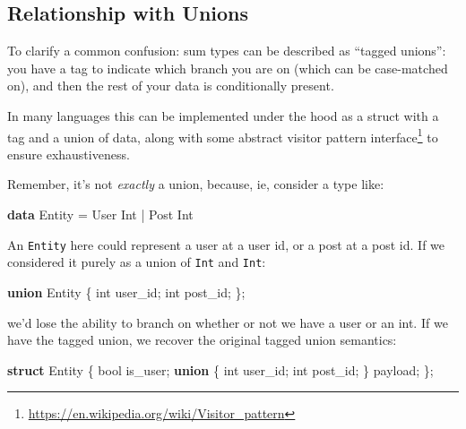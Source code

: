 \documentclass[]{article}
\newenvironment{Shaded}{}{}
\newcommand{\DataTypeTok}[1]{\textcolor[rgb]{0.56,0.13,0.00}{#1}}
\newcommand{\KeywordTok}[1]{\textcolor[rgb]{0.00,0.44,0.13}{\textbf{#1}}}
\newcommand{\NormalTok}[1]{#1}
\newcommand{\OperatorTok}[1]{\textcolor[rgb]{0.40,0.40,0.40}{#1}}
\newcommand{\OtherTok}[1]{\textcolor[rgb]{0.00,0.44,0.13}{#1}}
\renewcommand{\href}[2]{#2\footnote{\url{#1}}}
\begin{document}
\subsection{Relationship with Unions}\label{relationship-with-unions}

To clarify a common confusion: sum types can be described as ``tagged unions'':
you have a tag to indicate which branch you are on (which can be case-matched
on), and then the rest of your data is conditionally present.

In many languages this can be implemented under the hood as a struct with a tag
and a union of data, along with some
\href{https://en.wikipedia.org/wiki/Visitor_pattern}{abstract visitor pattern
interface} to ensure exhaustiveness.

Remember, it's not \emph{exactly} a union, because, ie, consider a type like:

\begin{Shaded}
\begin{Highlighting}[]
\KeywordTok{data} \DataTypeTok{Entity} \OtherTok{=} \DataTypeTok{User} \DataTypeTok{Int} \OperatorTok{|} \DataTypeTok{Post} \DataTypeTok{Int}
\end{Highlighting}
\end{Shaded}

An \texttt{Entity} here could represent a user at a user id, or a post at a post
id. If we considered it purely as a union of \texttt{Int} and \texttt{Int}:

\begin{Shaded}
\begin{Highlighting}[]
\KeywordTok{union}\NormalTok{ Entity }\OperatorTok{\{}
    \DataTypeTok{int}\NormalTok{ user\_id}\OperatorTok{;}
    \DataTypeTok{int}\NormalTok{ post\_id}\OperatorTok{;}
\OperatorTok{\};}
\end{Highlighting}
\end{Shaded}

we'd lose the ability to branch on whether or not we have a user or an int. If
we have the tagged union, we recover the original tagged union semantics:

\begin{Shaded}
\begin{Highlighting}[]
\KeywordTok{struct}\NormalTok{ Entity }\OperatorTok{\{}
    \DataTypeTok{bool}\NormalTok{ is\_user}\OperatorTok{;}
    \KeywordTok{union} \OperatorTok{\{}
        \DataTypeTok{int}\NormalTok{ user\_id}\OperatorTok{;}
        \DataTypeTok{int}\NormalTok{ post\_id}\OperatorTok{;}
    \OperatorTok{\}}\NormalTok{ payload}\OperatorTok{;}
\OperatorTok{\};}
\end{Highlighting}
\end{Shaded}
\end{document}
